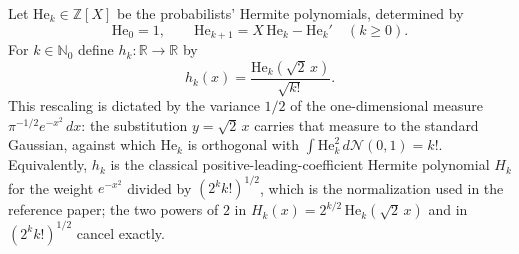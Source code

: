 \begin{definition}
Let $\mathrm{He}_k \in \mathbb{Z}[X]$ be the probabilists' Hermite polynomials,
determined by
\[
  \mathrm{He}_0 = 1,
  \qquad
  \mathrm{He}_{k+1} = X\,\mathrm{He}_k - \mathrm{He}_k'
  \quad (k \geq 0).
\]
For $k \in \mathbb{N}_0$ define $h_k : \mathbb{R} \to \mathbb{R}$ by
\[
  h_k(x) = \frac{\mathrm{He}_k(\sqrt{2}\,x)}{\sqrt{k!}} .
\]
This rescaling is dictated by the variance $1/2$ of the one-dimensional measure
$\pi^{-1/2} e^{-x^2}\,dx$: the substitution $y = \sqrt2\,x$ carries that measure to
the standard Gaussian, against which $\mathrm{He}_k$ is orthogonal with
$\int \mathrm{He}_k^2 \, d\mathcal{N}(0,1) = k!$.  Equivalently, $h_k$ is the classical
positive-leading-coefficient Hermite polynomial $H_k$ for the weight $e^{-x^2}$
divided by $(2^k k!)^{1/2}$, which is the normalization used in the reference
paper; the two powers of $2$ in $H_k(x) = 2^{k/2}\,\mathrm{He}_k(\sqrt2\,x)$ and in
$(2^k k!)^{1/2}$ cancel exactly.
\end{definition}
